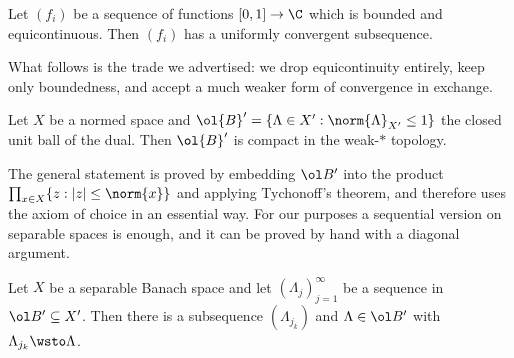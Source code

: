 \begin{theorem}\label{thm:arzela}
	Let $(f_i)$ be a sequence of functions $[0,1]\to\C$ which is bounded and equicontinuous. Then $(f_i)$ has a uniformly convergent subsequence.
\end{theorem}

What follows is the trade we advertised: we drop equicontinuity entirely, keep only boundedness, and accept a much weaker form of convergence in exchange.

\begin{theorem}\label{thm:alaoglu}
	Let $X$ be a normed space and $\ol{B}' = \{\Lambda \in X' : \norm{\Lambda}_{X'}\le 1\}$ the closed unit ball of the dual. Then $\ol{B}'$ is compact in the weak-$*$ topology.
\end{theorem}

The general statement is proved by embedding $\ol B'$ into the product $\prod_{x \in X}\{z : |z| \le \norm{x}\}$ and applying Tychonoff's theorem, and therefore uses the axiom of choice in an essential way. For our purposes a sequential version on separable spaces is enough, and it can be proved by hand with a diagonal argument.

\begin{theorem}\label{thm:alaoglu2}
	Let $X$ be a separable Banach space and let $(\Lambda_j)_{j=1}^\infty$ be a sequence in $\ol B' \subseteq X'$. Then there is a subsequence $(\Lambda_{j_k})$ and $\Lambda \in \ol B'$ with $\Lambda_{j_k}\wsto\Lambda$.
\end{theorem}

